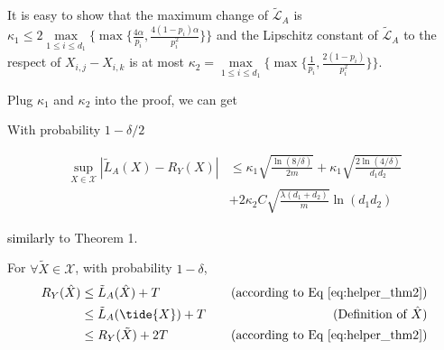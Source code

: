 \documentclass[conference]{IEEEtran}
\numberwithin{equation}{section}
\newcommand{\laks}[1]{\textcolor{black}{#1}}
\newtheorem{sampling strategy}{Sampling Strategy}
\begin{document}
It is easy to show that 
the maximum change of $\tilde{\mathcal{L}}_A$ is $\kappa_1 \leq 2 \underset{1\leq i \leq d_1}{\max} \bigg\{ \max \Big\{ \frac{4\alpha}{p_{i}}, \frac{4(1-p_i)\alpha}{p_i^2} \Big\} \bigg\}$
and the Lipschitz constant of $\tilde{\mathcal{L}}_A$ to the respect of $X_{i,j} - X_{i,k}$ is at most $\kappa_2 = \underset{1\leq i\leq d_1}{\max}\{ \max\{\frac{1}{p_i}, \frac{2(1 - p_i)}{p_i^2}\} \}$.

Plug $\kappa_1$ and $\kappa_2$ into the proof, we can get

With probability $1 - \delta/2$

\begin{equation}
    \begin{aligned}
    \sup_{X \in \mathcal{X} } |\tilde{L}_A(X) - R_Y(X)| & \leq \kappa_1 \sqrt{\frac{\ln(8/\delta)}{2m}} + \kappa_1 \sqrt{ \frac{2\ln(4/\delta) }{d_1 d_2} } \\
        & + 2 \kappa_2 C \sqrt{\frac{\lambda(d_1 + d_2)}{m}} \ln(d_1 d_2) \label{eq:helper_thm2}
    \end{aligned}
\end{equation}

\laks{similarly} to Theorem 1. %

For $\forall \tilde{X} \in \mathcal{X}$, with probability $1 - \delta$,
\begin{equation}
    \begin{aligned}
        R_Y(\hat{X}) & \leq \tilde{L}_A(\hat{X}) + T &~~~\text{(according to Eq \ref{eq:helper_thm2})} \\
        & \leq \tilde{L}_A(\tide{X}) + T &\text{(Definition of $\hat{X}$)} \\
        & \leq R_Y(\tilde{X}) + 2T  &\text{(according to Eq \ref{eq:helper_thm2})} \nonumber    
    \end{aligned}
\end{equation}
\end{document}
